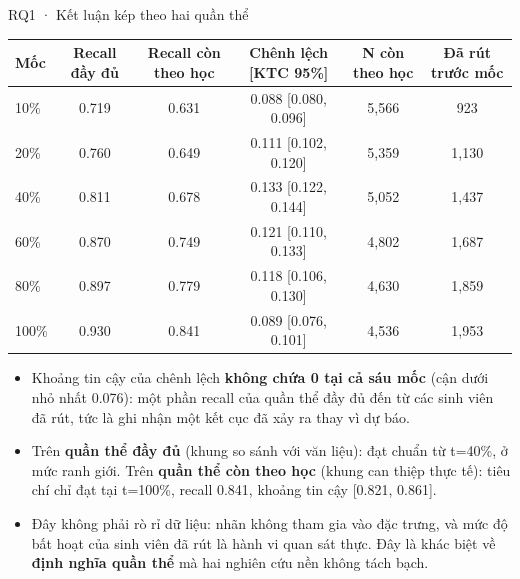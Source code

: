 \documentclass[aspectratio=169,11pt]{beamer}
\begin{document}
\begin{frame}{RQ1 · Kết luận kép theo hai quần thể}
\centering\small
\begin{tabular}{@{}lccccc@{}}
\toprule
\textbf{Mốc} & \textbf{Recall đầy đủ} & \textbf{Recall còn theo học} & \textbf{Chênh lệch [KTC 95\%]} & \textbf{N còn theo học} & \textbf{Đã rút trước mốc} \\
\midrule
    10\% & 0.719 & 0.631 & 0.088 [0.080, 0.096] & 5,566 & 923 \\
    20\% & 0.760 & 0.649 & 0.111 [0.102, 0.120] & 5,359 & 1,130 \\
    40\% & 0.811 & 0.678 & 0.133 [0.122, 0.144] & 5,052 & 1,437 \\
    60\% & 0.870 & 0.749 & 0.121 [0.110, 0.133] & 4,802 & 1,687 \\
    80\% & 0.897 & 0.779 & 0.118 [0.106, 0.130] & 4,630 & 1,859 \\
    100\% & 0.930 & 0.841 & 0.089 [0.076, 0.101] & 4,536 & 1,953 \\
\bottomrule
\end{tabular}
\vspace{2mm}
\begin{itemize}\small
  \item Khoảng tin cậy của chênh lệch \textbf{không chứa 0 tại cả sáu mốc} (cận dưới nhỏ nhất 0.076): một phần recall của quần thể đầy đủ đến từ các sinh viên đã rút, tức là ghi nhận một kết cục đã xảy ra thay vì dự báo.
  \item Trên \textbf{quần thể đầy đủ} (khung so sánh với văn liệu): đạt chuẩn từ t=40\%, ở mức ranh giới. Trên \textbf{quần thể còn theo học} (khung can thiệp thực tế): tiêu chí chỉ đạt tại t=100\%, recall 0.841, khoảng tin cậy [0.821, 0.861].
  \item Đây không phải rò rỉ dữ liệu: nhãn không tham gia vào đặc trưng, và mức độ bất hoạt của sinh viên đã rút là hành vi quan sát thực. Đây là khác biệt về \textbf{định nghĩa quần thể} mà hai nghiên cứu nền không tách bạch.
\end{itemize}
\end{frame}
\end{document}
